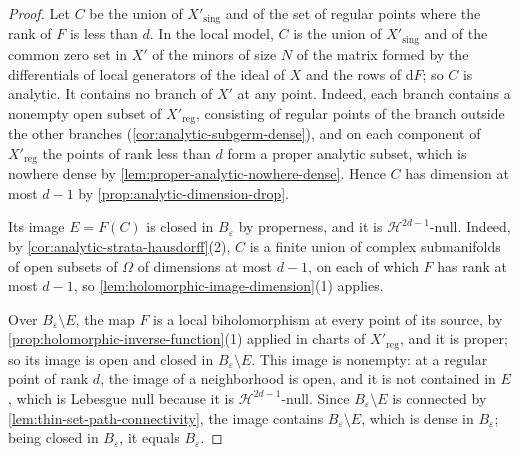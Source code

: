 \begin{proof}
Let $C$ be the union of $X'_{\mathrm{sing}}$ and of the set of regular points where the rank of $F$ is less than $d$. In the local model, $C$ is the union of $X'_{\mathrm{sing}}$ and of the common zero set in $X'$ of the minors of size $N$ of the matrix formed by the differentials of local generators of the ideal of $X$ and the rows of $\mathrm dF$; so $C$ is analytic. It contains no branch of $X'$ at any point. Indeed, each branch contains a nonempty open subset of $X'_{\mathrm{reg}}$, consisting of regular points of the branch outside the other branches (\cref{cor:analytic-subgerm-dense}), and on each component of $X'_{\mathrm{reg}}$ the points of rank less than $d$ form a proper analytic subset, which is nowhere dense by \cref{lem:proper-analytic-nowhere-dense}. Hence $C$ has dimension at most $d-1$ by \cref{prop:analytic-dimension-drop}.

Its image $E=F(C)$ is closed in $B_\varepsilon$ by properness, and it is $\mathcal H^{2d-1}$-null. Indeed, by \cref{cor:analytic-strata-hausdorff}(2), $C$ is a finite union of complex submanifolds of open subsets of $\Omega$ of dimensions at most $d-1$, on each of which $F$ has rank at most $d-1$, so \cref{lem:holomorphic-image-dimension}(1) applies.

Over $B_\varepsilon\setminus E$, the map $F$ is a local biholomorphism at every point of its source, by \cref{prop:holomorphic-inverse-function}(1) applied in charts of $X'_{\mathrm{reg}}$, and it is proper; so its image is open and closed in $B_\varepsilon\setminus E$. This image is nonempty: at a regular point of rank $d$, the image of a neighborhood is open, and it is not contained in $E$, which is Lebesgue null because it is $\mathcal H^{2d-1}$-null. Since $B_\varepsilon\setminus E$ is connected by \cref{lem:thin-set-path-connectivity}, the image contains $B_\varepsilon\setminus E$, which is dense in $B_\varepsilon$; being closed in $B_\varepsilon$, it equals $B_\varepsilon$.
\end{proof}

